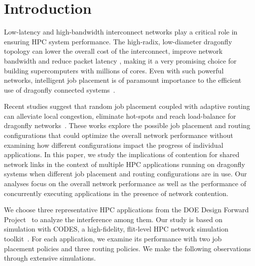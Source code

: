 \section{Introduction}
\label{sec:intro}

Low-latency and high-bandwidth interconnect networks play a critical role in ensuring HPC system performance. 
The high-radix, low-diameter dragonfly topology can lower the overall cost of the interconnect, improve network bandwidth and reduce packet latency \cite{dally-dragonfly}, 
making it a very promising choice for building supercomputers with millions of cores.
Even with such powerful networks, 
intelligent job placement is of paramount importance to the efficient use of dragonfly connected systems~\cite{bhatele2015, jain-sc14}. 

Recent studies suggest that random job placement coupled with adaptive routing can alleviate local congestion, eliminate hot-spots and reach load-balance for dragonfly networks~\cite{jain-sc14, bhatele-sc11, brandt2014}. 
These works explore the possible job placement and routing configurations that could optimize the overall network performance without examining how different configurations impact the progress of individual applications.
In this paper, we study the implications of contention for shared network links in the context of multiple HPC applications running on dragonfly systems when different job placement and routing configurations are in use.
Our analyses focus on the overall network performance as well as the performance of concurrently executing applications in the presence of network contention.



We choose three representative HPC applications from the DOE Design Forward Project~\cite{designforward-webpage} to analyze the interference among them. Our study is based on simulation with CODES, a high-fidelity, flit-level HPC network simulation toolkit~\cite{codes}.
For each application, we examine its performance with two job placement policies and three routing policies.
We make the following observations through extensive simulations.


